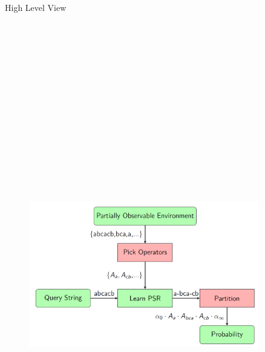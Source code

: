 \documentclass[final]{beamer}
\newlength{\sepwid}
\newlength{\onecolwid}
\newlength{\twocolwid}
\begin{document}
\begin{frame}[t]
\begin{columns}[t]
\begin{column}{\onecolwid}
\begin{block}{High Level View}
\begin{figure}
\includegraphics[height=22cm,width=1.05\linewidth]{bigpicturediagram.png}
\end{figure}

\end{block}






\end{column} %
\begin{column}{\sepwid}\end{column} %
\begin{column}{\twocolwid} %
\begin{columns}[t,totalwidth=\twocolwid] %


\end{columns}
\end{column}
\end{columns}
\end{frame}
\end{document}
